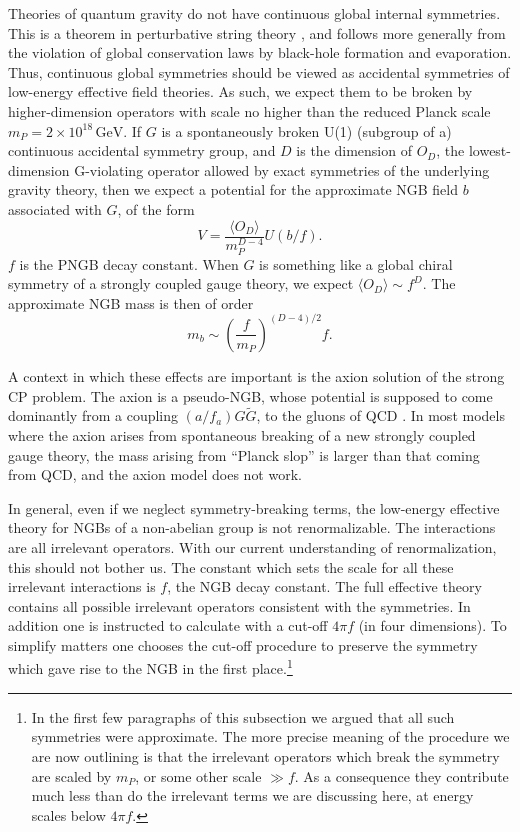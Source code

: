 Theories of quantum gravity do not have continuous global internal symmetries.
This is a theorem in perturbative string theory \cite{banks-ref-129}, and
follows more generally from the violation of global conservation laws by
black-hole formation and evaporation. Thus, continuous global symmetries should
be viewed as accidental symmetries of low-energy effective field theories. As
such, we expect them to be broken by higher-dimension operators with scale no
higher than the reduced Planck scale $m_P=2\times10^{18}\,\mathrm{GeV}$. If $G$
is a spontaneously broken U(1) (subgroup of a) continuous accidental symmetry
group, and $D$ is the dimension of $O_D$, the lowest-dimension G-violating
operator allowed by exact symmetries of the underlying gravity theory, then we
expect a potential for the approximate NGB field $b$ associated with $G$, of
the form
\[
  V=\frac{\langle O_D\rangle}{m_P^{D-4}}U(b/f).
\]
$f$ is the PNGB decay constant. When $G$ is something like a global chiral
symmetry of a strongly coupled gauge theory, we expect $\langle O_D\rangle
\sim f^D$. The approximate NGB mass is then of order
\[
  m_b\sim\left(\frac{f}{m_P}\right)^{(D-4)/2}f.
\]

A context in which these effects are important is the axion solution of the
strong CP problem. The axion is a pseudo-NGB, whose potential is supposed to
come dominantly from a coupling $(a/f_a)G\widetilde G$, to the gluons of QCD
\cite{banks-ref-130}. In most models where the axion arises from spontaneous
breaking of a new strongly coupled gauge theory, the mass arising from
``Planck slop'' is larger than that coming from QCD, and the axion model does
not work.

In general, even if we neglect symmetry-breaking terms, the low-energy effective
theory for NGBs of a non-abelian group is not renormalizable. The interactions
are all irrelevant operators. With our current understanding of renormalization,
this should not bother us. The constant which sets the scale for all these
irrelevant interactions is $f$, the NGB decay constant. The full effective
theory contains all possible irrelevant operators consistent with the
symmetries. In addition one is instructed to calculate with a cut-off $4\pi f$
(in four dimensions). To simplify matters one chooses the cut-off procedure to
preserve the symmetry which gave rise to the NGB in the first place.\footnote[22]{In
the first few paragraphs of this subsection we argued that all such symmetries
were approximate. The more precise meaning of the procedure we are now
outlining is that the irrelevant operators which break the symmetry are scaled
by $m_P$, or some other scale $\gg f$. As a consequence they contribute much
less than do the irrelevant terms we are discussing here, at energy scales
below $4\pi f$.}

